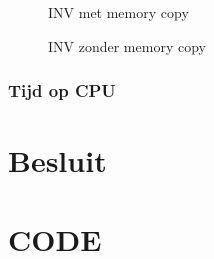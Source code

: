 \documentclass[twoside,a4paper]{article}
\begin{document}
\begin{figure}[H]
    \centering
    
    \caption{INV met memory copy}
    \label{}
\end{figure}

\begin{figure}[H]
    \centering
    
    \caption{INV zonder memory copy}
    \label{}
\end{figure}

\subsubsection{Tijd op CPU}

\newpage
\section{Besluit}



\newpage
\appendix
\section{CODE}
\label{code}
\inputminted[linenos=true, breaklines=true]{cuda}{template.cu}

\clearpage



\end{document}
